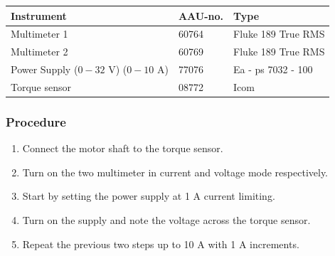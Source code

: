 \begin{table}[H]
\begin{tabular}{|l|l|p{4cm}|}
\hline%
  \textbf{Instrument}                        &  \textbf{AAU-no.}  &  \textbf{Type}       \\
\hline%
  Multimeter 1                               &  60764             &  Fluke 189 True RMS  \\
\hline%
  Multimeter 2                   		         &  60769             &  Fluke 189 True RMS  \\
\hline%
  Power Supply ($0 - 32$ V) ($0 - 10$ A)     &  77076             &  Ea - ps 7032 - 100  \\
\hline%
  Torque sensor                              &  08772             &  Icom                \\
\hline%
\end{tabular}
\end{table}

\subsubsection{Procedure}

\begin{enumerate}
  \item Connect the motor shaft to the torque sensor.
  \item Turn on the two multimeter in current and voltage mode respectively.
  \item Start by setting the power supply at 1 A current limiting.
  \item Turn on the supply and note the voltage across the torque sensor.
  \item Repeat the previous two steps up to 10 A with 1 A increments.
\end{enumerate}
